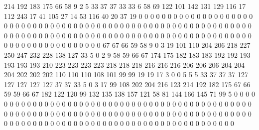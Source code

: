 214 192 183 175 66 58 9 2 5 33 37 37 33 33 6 58 69 122 101 142
131 129 116 17 112 243 17 41 105 27 14 53 116 40 20 37 19 0 0 0
0 0 0 0 0 0 0 0 0 0 0 0 0 0 0 0 0 0 0 0
0 0 0 0 0 0 0 0 0 0 0 0 0 0 0 0 0 0 0 0
0 0 0 0 0 0 0 0 0 0 0 0 0 0 0 0 0 0 0 0
0 0 0 0 0 0 0 0 0 0 0 0 0 0 0 0 0 0 0 0
0 0 0 0 0 0 0 0 0 0 0 0 0 0 0 0 0 0 0 0
0 0 0 0 0 0 0 0 0 0 0 0 0 0 0 0 0 0 0 0
67 67 66 59 58 9 0 3 19 101 110 204 206 218 227 250 247 232 228 138
127 33 5 0 2 9 58 59 66 67 174 175 182 183 183 192 192 193 193 193
193 210 223 223 223 223 218 218 218 216 216 216 206 206 206 204 204 204 202 202
202 110 110 110 108 101 99 99 19 19 17 3 0 0 5 5 5 33 37 37
37 127 127 127 127 127 37 37 33 5 0 3 17 99 108 202 204 216 123 214
192 182 175 67 66 59 59 66 67 182 122 120 99 132 135 138 157 121 58 81
144 166 145 71 99 5 0 0 0 0 0 0 0 0 0 0 0 0 0 0
0 0 0 0 0 0 0 0 0 0 0 0 0 0 0 0 0 0 0 0
0 0 0 0 0 0 0 0 0 0 0 0 0 0 0 0 0 0 0 0
0 0 0 0 0 0 0 0 0 0 0 0 0 0 0 0 0 0 0 0
0 0 0 0 0 0 0 0 0 0 0 0 0 0 0 0 0 0 0 0
0 0 0 0 0 0 0 0 0 0 0 0 0 0 0 0 0 0 0 0
0 0 0 0 0 0 0 0 0 0 0 0 0 0 0 0
